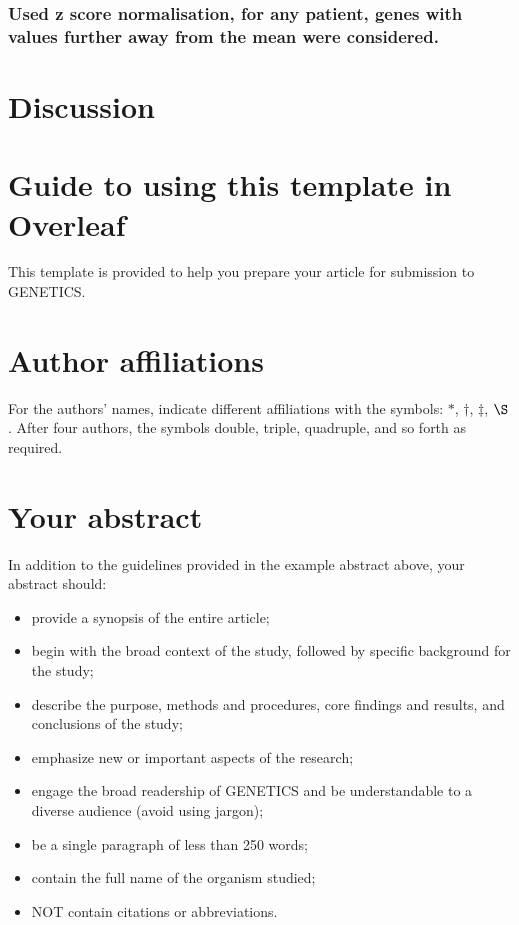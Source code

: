 \documentclass[10pt,twocolumn,twoside,lineno]{gsajnl}
\begin{document}
\subsubsection{Used z score normalisation, for any patient, genes with values further away from the mean were considered.}

\section{Discussion}



\section{Guide to using this template in Overleaf}

This template is provided to help you prepare your article for submission to GENETICS.

\section{Author affiliations}

For the authors' names, indicate different affiliations with the symbols: $\ast$, $\dagger$, $\ddagger$, $\S$. After four authors, the symbols double, triple, quadruple, and so forth as required.

\section{Your abstract}

In addition to the guidelines provided in the example abstract above, your abstract should:

\begin{itemize}
\item provide a synopsis of the entire article;
\item begin with the broad context of the study, followed by specific background for the study;
\item describe the purpose, methods and procedures, core findings and results, and conclusions of the study;
\item emphasize new or important aspects of the research;
\item engage the broad readership of GENETICS and be understandable to a diverse audience (avoid using jargon);
\item be a single paragraph of less than 250 words;
\item contain the full name of the organism studied;
\item NOT contain citations or abbreviations.
\end{itemize}
\end{document}
